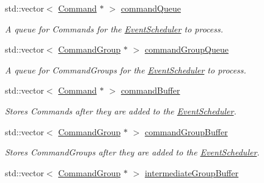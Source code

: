 \begin{DoxyCompactItemize}
std\+::vector$<$ \mbox{\hyperlink{classlib_iterative_robot_1_1_command}{Command}} $\ast$ $>$ \mbox{\hyperlink{classlib_iterative_robot_1_1_event_scheduler_a24710c3528945cb3ed1e9ae61267b570}{command\+Queue}}
\begin{DoxyCompactList}\small\item\em A queue for Commands for the \mbox{\hyperlink{classlib_iterative_robot_1_1_event_scheduler}{Event\+Scheduler}} to process. \end{DoxyCompactList}\item 
\mbox{\label{classlib_iterative_robot_1_1_event_scheduler_a355d50b2ab9edbb9295cd0a540422be6}} 
std\+::vector$<$ \mbox{\hyperlink{classlib_iterative_robot_1_1_command_group}{Command\+Group}} $\ast$ $>$ \mbox{\hyperlink{classlib_iterative_robot_1_1_event_scheduler_a355d50b2ab9edbb9295cd0a540422be6}{command\+Group\+Queue}}
\begin{DoxyCompactList}\small\item\em A queue for Command\+Groups for the \mbox{\hyperlink{classlib_iterative_robot_1_1_event_scheduler}{Event\+Scheduler}} to process. \end{DoxyCompactList}\item 
std\+::vector$<$ \mbox{\hyperlink{classlib_iterative_robot_1_1_command}{Command}} $\ast$ $>$ \mbox{\hyperlink{classlib_iterative_robot_1_1_event_scheduler_a1ddae49a738b69e0e73b4b529a585226}{command\+Buffer}}
\begin{DoxyCompactList}\small\item\em Stores Commands after they are added to the \mbox{\hyperlink{classlib_iterative_robot_1_1_event_scheduler}{Event\+Scheduler}}. \end{DoxyCompactList}\item 
std\+::vector$<$ \mbox{\hyperlink{classlib_iterative_robot_1_1_command_group}{Command\+Group}} $\ast$ $>$ \mbox{\hyperlink{classlib_iterative_robot_1_1_event_scheduler_a37b0c1d9ec0c00e7729bec67ebbd9986}{command\+Group\+Buffer}}
\begin{DoxyCompactList}\small\item\em Stores Command\+Groups after they are added to the \mbox{\hyperlink{classlib_iterative_robot_1_1_event_scheduler}{Event\+Scheduler}}. \end{DoxyCompactList}\item 
std\+::vector$<$ \mbox{\hyperlink{classlib_iterative_robot_1_1_command_group}{Command\+Group}} $\ast$ $>$ \mbox{\hyperlink{classlib_iterative_robot_1_1_event_scheduler_a4a5d6ac28a4a988e4350b060f7214b3d}{intermediate\+Group\+Buffer}}

\end{DoxyCompactItemize}
